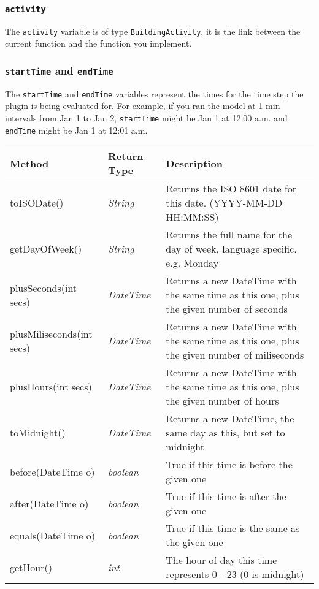 \documentclass[12pt,a4paper]{article}
\begin{document}
\subsubsection[activity]{\texttt{activity}}
The \texttt{activity} variable is of type \texttt{BuildingActivity}, it is the link between the current function and the function you implement.


\subsubsection[startTime and endTime]{\texttt{startTime} and \texttt{endTime}}
The \texttt{startTime} and \texttt{endTime} variables represent the times for the time step the plugin is being evaluated for. For example, if you ran the model at 1 min intervals from Jan 1 to Jan 2, \texttt{startTime} might be Jan 1 at 12:00 a.m. and \texttt{endTime} might be Jan 1 at 12:01 a.m.

\begin{center}
\begin{tabular}{p{3cm}p{3cm}p{6.5cm}}
	\hline
	\textbf{Method} & \textbf{Return Type} & \textbf{Description}\\ 
	\hline
	toISODate()& \emph{String} & Returns the ISO 8601 date for this date. (YYYY-MM-DD HH:MM:SS)\\ 
	\hline
	getDayOfWeek()& \emph{String} & Returns the full name for the day of week, language specific. e.g. Monday\\
	\hline
	plusSeconds(int secs)& \emph{DateTime} & Returns a new DateTime with the same time as this one, plus the given number of seconds\\
	\hline
	plusMiliseconds(int secs)& \emph{DateTime} & Returns a new DateTime with the same time as this one, plus the given number of miliseconds\\
	\hline
	plusHours(int secs)& \emph{DateTime} & Returns a new DateTime with the same time as this one, plus the given number of hours\\
	\hline
	toMidnight()& \emph{DateTime} & Returns a new DateTime, the same day as this, but set to midnight\\
	\hline
	before(DateTime o)& \emph{boolean} & True if this time is before the given one\\
	\hline
	after(DateTime o)& \emph{boolean} & True if this time is after the given one\\
	\hline
	equals(DateTime o)& \emph{boolean} & True if this time is the same as the given one\\
	\hline
	getHour()& \emph{int} & The hour of day this time represents 0 - 23 (0 is midnight)\\
	\hline
\end{tabular}
\end{center}
\end{document}
